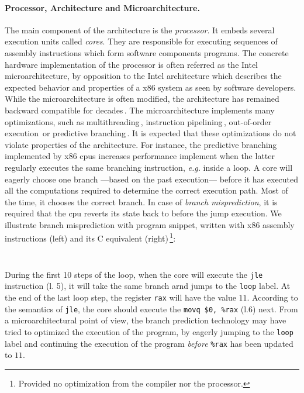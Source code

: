 \paragraph{Processor, Architecture and Microarchitecture.}
%
The main component of the architecture is the \emph{processor}.
%
It embeds several execution units called \emph{cores}.
%
They are responsible for executing sequences of assembly instructions which form
software components programs.
%
The concrete hardware implementation of the processor is often referred as the
Intel microarchitecture, by opposition to the Intel architecture which describes
the expected behavior and properties of a x86 system as seen by software
developers.
%
While the microarchitecture is often modified, the architecture has remained
backward compatible for decades\,\cite{turley2014introx86}.
%
The microarchitecture implements many optimizations, such as
multithreading\,\cite{marr2002hypertheading}, instruction
pipelining\,\cite{fog2012microarchitecture}, out-of-order
execution\,\cite[Section 2]{fog2012microarchitecture} or predictive
branching\,\cite{milenkovic2002branchprediction}\cite[Section
3]{fog2012microarchitecture}.
%
It is expected that these optimizations do not violate properties of the
architecture.
%
For instance, the predictive branching implemented by x86 \acp{cpu} increases
performance implement when the latter regularly executes the same branching
instruction, \emph{e.g.} inside a loop.
%
A core will eagerly choose one branch ---based on the past execution--- before
it has executed all the computations required to determine the correct execution
path.
%
Most of the time, it chooses the correct branch.
%
In case of \emph{branch misprediction}, it is required that the \ac{cpu} reverts
its state back to before the jump execution.
%
We illustrate branch misprediction with program snippet, written with x86
assembly instructions (left) and its C equivalent (right)\,\footnote{Provided no
  optimization from the compiler nor the processor.}:
%
\begin{center}
  \begin{minipage}[t]{0.35\linewidth}
    \inputminted{asm}{Listings/predict.S}
  \end{minipage}
  \begin{minipage}[t]{0.35\linewidth}
    \inputminted{c}{Listings/predict.c}
  \end{minipage}
\end{center}
%
During the first 10 steps of the loop, when the core will execute the
\texttt{jle} instruction (l. 5), it will take the same branch arnd jumps to the
\texttt{loop} label.
%
At the end of the last loop step, the register \texttt{rax} will have the value
\( 11 \).
%
According to the semantics of \texttt{jle}, the core should execute the
\texttt{movq~\$0,~\%rax} (l.6) next.
%
From a microarchitectural point of view, the branch prediction technology may
have tried to optimized the execution of the program, by eagerly jumping to the
\texttt{loop} label and continuing the execution of the program \emph{before}
\texttt{\%rax} has been updated to \( 11 \).
%

